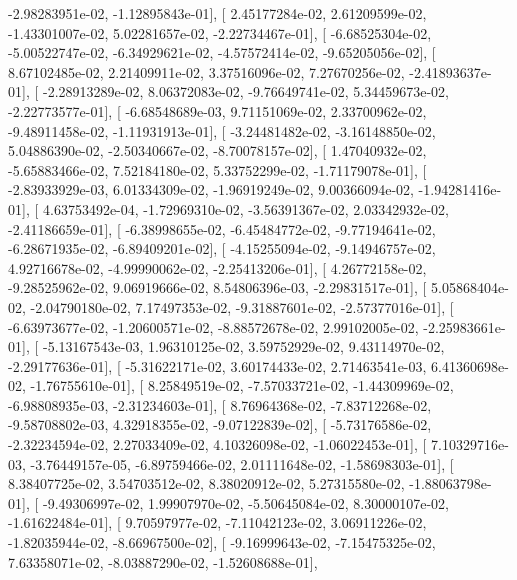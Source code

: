 \documentclass{article}
\begin{document}
         -2.98283951e-02,  -1.12895843e-01],
       [  2.45177284e-02,   2.61209599e-02,  -1.43301007e-02,
          5.02281657e-02,  -2.22734467e-01],
       [ -6.68525304e-02,  -5.00522747e-02,  -6.34929621e-02,
         -4.57572414e-02,  -9.65205056e-02],
       [  8.67102485e-02,   2.21409911e-02,   3.37516096e-02,
          7.27670256e-02,  -2.41893637e-01],
       [ -2.28913289e-02,   8.06372083e-02,  -9.76649741e-02,
          5.34459673e-02,  -2.22773577e-01],
       [ -6.68548689e-03,   9.71151069e-02,   2.33700962e-02,
         -9.48911458e-02,  -1.11931913e-01],
       [ -3.24481482e-02,  -3.16148850e-02,   5.04886390e-02,
         -2.50340667e-02,  -8.70078157e-02],
       [  1.47040932e-02,  -5.65883466e-02,   7.52184180e-02,
          5.33752299e-02,  -1.71179078e-01],
       [ -2.83933929e-03,   6.01334309e-02,  -1.96919249e-02,
          9.00366094e-02,  -1.94281416e-01],
       [  4.63753492e-04,  -1.72969310e-02,  -3.56391367e-02,
          2.03342932e-02,  -2.41186659e-01],
       [ -6.38998655e-02,  -6.45484772e-02,  -9.77194641e-02,
         -6.28671935e-02,  -6.89409201e-02],
       [ -4.15255094e-02,  -9.14946757e-02,   4.92716678e-02,
         -4.99990062e-02,  -2.25413206e-01],
       [  4.26772158e-02,  -9.28525962e-02,   9.06919666e-02,
          8.54806396e-03,  -2.29831517e-01],
       [  5.05868404e-02,  -2.04790180e-02,   7.17497353e-02,
         -9.31887601e-02,  -2.57377016e-01],
       [ -6.63973677e-02,  -1.20600571e-02,  -8.88572678e-02,
          2.99102005e-02,  -2.25983661e-01],
       [ -5.13167543e-03,   1.96310125e-02,   3.59752929e-02,
          9.43114970e-02,  -2.29177636e-01],
       [ -5.31622171e-02,   3.60174433e-02,   2.71463541e-03,
          6.41360698e-02,  -1.76755610e-01],
       [  8.25849519e-02,  -7.57033721e-02,  -1.44309969e-02,
         -6.98808935e-03,  -2.31234603e-01],
       [  8.76964368e-02,  -7.83712268e-02,  -9.58708802e-03,
          4.32918355e-02,  -9.07122839e-02],
       [ -5.73176586e-02,  -2.32234594e-02,   2.27033409e-02,
          4.10326098e-02,  -1.06022453e-01],
       [  7.10329716e-03,  -3.76449157e-05,  -6.89759466e-02,
          2.01111648e-02,  -1.58698303e-01],
       [  8.38407725e-02,   3.54703512e-02,   8.38020912e-02,
          5.27315580e-02,  -1.88063798e-01],
       [ -9.49306997e-02,   1.99907970e-02,  -5.50645084e-02,
          8.30000107e-02,  -1.61622484e-01],
       [  9.70597977e-02,  -7.11042123e-02,   3.06911226e-02,
         -1.82035944e-02,  -8.66967500e-02],
       [ -9.16999643e-02,  -7.15475325e-02,   7.63358071e-02,
         -8.03887290e-02,  -1.52608688e-01],
\end{document}
